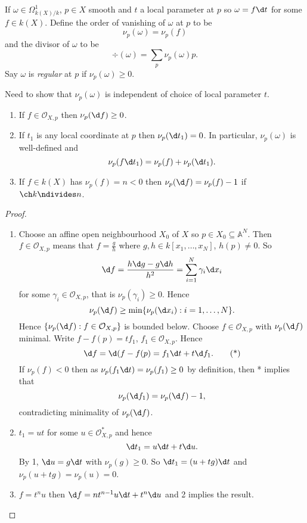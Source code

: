 \documentclass[a4paper]{article}
\renewcommand{\A}{\mathbb{A}}
\begin{document}
\begin{definition}[regular]
  If \(\omega \in \Omega^1_{k(X)/k}\), \(p \in X\) smooth and \(t\) a local parameter at \(p\) so \(\omega = f \d t\) for some \(f \in k(X)\). Define the order of vanishing of \(\omega\) at \(p\) to be
  \[
    \nu_p(\omega) = \nu_p(f)
  \]
  and the divisor of \(\omega\) to be
  \[
    \div(\omega) = \sum_p \nu_p(\omega) p.
  \]
  Say \(\omega\) is \emph{regular} at \(p\) if \(\nu_p(\omega) \geq 0\).
\end{definition}
Need to show that \(\nu_p(\omega)\) is independent of choice of local parameter \(t\).

\begin{lemma}\leavevmode
  \begin{enumerate}
  \item If \(f \in \mathcal O_{X, p}\) then \(\nu_p(\d f) \geq 0\).
  \item If \(t_1\) is any local coordinate at \(p\) then \(\nu_p(\d t_1) = 0\). In particular, \(\nu_p(\omega)\) is well-defined and
    \[
      \nu_p(f \d t_1) = \nu_p(f) + \nu_p(\d t_1).
    \]
  \item If \(f \in k(X)\) has \(\nu_p(f) = n < 0\) then \(\nu_p(\d f) = \nu_p(f) - 1\) if \(\ch k \ndivides n\).
  \end{enumerate}
\end{lemma}

\begin{proof}\leavevmode
  \begin{enumerate}
  \item Choose an affine open neighbourhood \(X_0\) of \(X\) so \(p \in X_0 \subseteq \A^N\). Then \(f \in \mathcal O_{X, p}\) means that \(f = \frac{g}{h}\) where \(g, h \in k[x_1, \dots, x_N]\), \(h(p) \neq 0\). So
    \[
      \d f = \frac{h \d g - g \d h}{h^2} = \sum_{i = 1}^N \gamma_i \d x_i
    \]
    for some \(\gamma_i \in \mathcal O_{X, p}\), that is \(\nu_p(\gamma_i) \geq 0\). Hence
    \[
      \nu_p(\d f) \geq \min \{\nu_p(\d x_i): i = 1, \dots, N\}.
    \]
    Hence \(\{\nu_p(\d f): f \in \mathcal O_{X, p}\}\) is bounded below. Choose \(f \in \mathcal O_{X, p}\) with \(\nu_p(\d f)\) minimal. Write \(f - f(p) = t f_1\), \(f_1 \in \mathcal O_{X, p}\). Hence
    \[
      \d f = \d(f - f(p) = f_1 \d t + t \d f_1.
      \tag{*}
    \]
    If \(\nu_p(f) < 0\) then as \(\nu_p(f_1 \d t) = \nu_p(f_1) \geq 0\) by definition, then * implies that
    \[
      \nu_p(\d f_1) = \nu_p(\d f) - 1,
    \]
    contradicting minimality of \(\nu_p(\d f)\).
  \item \(t_1 = u t\) for some \(u \in \mathcal O_{X, p}^*\) and hence
    \[
      \d t_1 = u \d t + t \d u.
    \]
    By 1, \(\d u = g \d t\) with \(\nu_p(g) \geq 0\). So \(\d t_1 = (u + tg) \d t\) and \(\nu_p(u + tg) = \nu_p(u) = 0\).
  \item \(f = t^n u\) then \(\d f = n t^{n - 1} u \d t + t^n \d u\) and 2 implies the result.
  \end{enumerate}
\end{proof}
\end{document}
